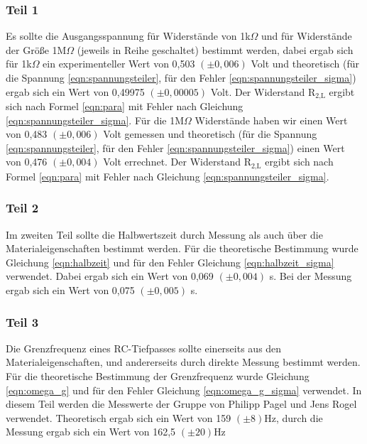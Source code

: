 \documentclass[12pt]{scrartcl}
\begin{document}
\subsubsection{Teil 1}
Es sollte die Ausgangsspannung für Widerstände von 1k$\Omega$ und für Widerstände der Größe 1M$\Omega$ (jeweils in Reihe geschaltet) bestimmt werden, dabei ergab sich für 1k$\Omega$ ein experimenteller Wert von 0,503 $(\pm 0,006)$ Volt und theoretisch (für die Spannung \ref{eqn:spannungsteiler}, für den Fehler \ref{eqn:spannungsteiler_sigma}) ergab sich ein Wert von 0,49975 $(\pm 0,00005)$ Volt. Der Widerstand R$_\text{2,L}$ ergibt sich nach Formel \ref{eqn:para} mit Fehler nach Gleichung \ref{eqn:spannungsteiler_sigma}. Für die 1M$\Omega$ Widerstände haben wir einen Wert von 0,483 $(\pm 0,006)$ Volt gemessen und theoretisch (für die Spannung \ref{eqn:spannungsteiler}, für den Fehler \ref{eqn:spannungsteiler_sigma}) einen Wert von 0,476 $(\pm 0,004)$ Volt errechnet. Der Widerstand R$_\text{2,L}$ ergibt sich nach Formel \ref{eqn:para} mit Fehler nach Gleichung \ref{eqn:spannungsteiler_sigma}.

\subsubsection{Teil 2}
Im zweiten Teil sollte die Halbwertszeit durch Messung als auch über die Materialeigenschaften bestimmt werden. Für die theoretische Bestimmung wurde Gleichung \ref{eqn:halbzeit} und für den Fehler Gleichung \ref{eqn:halbzeit_sigma} verwendet. Dabei ergab sich ein Wert von 0,069	$(\pm 0,004)$ s. Bei der Messung ergab sich ein Wert von 0,075 $(\pm 0,005)$ s.

\subsubsection{Teil 3}
Die Grenzfrequenz eines RC-Tiefpasses sollte einerseits aus den Materialeigenschaften, und andererseits durch direkte Messung bestimmt werden. Für die theoretische Bestimmung der Grenzfrequenz wurde Gleichung \ref{eqn:omega_g} und für den Fehler Gleichung \ref{eqn:omega_g_sigma} verwendet.
In diesem Teil werden die Messwerte der Gruppe von Philipp Pagel und Jens Rogel verwendet.
Theoretisch ergab sich ein Wert von 159 $(\pm 8)$Hz, durch die Messung ergab sich ein Wert von 162,5 $(\pm 20)$Hz 
\end{document}

